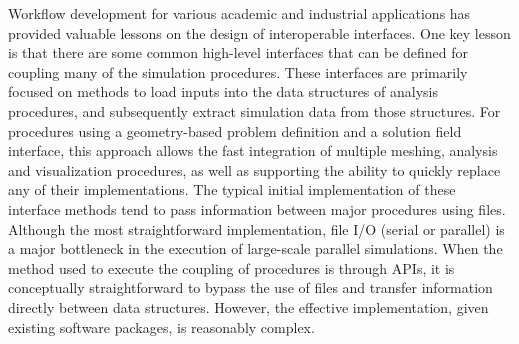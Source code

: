 Workflow development for various academic and industrial applications has
provided valuable lessons on the design of interoperable interfaces.
One key lesson is that there are some common high-level interfaces that can be
defined for coupling many of the simulation procedures.
These interfaces are primarily focused on methods to load inputs into the
data structures of analysis procedures, and subsequently extract
simulation data from those structures.
For procedures using a geometry-based problem definition and a solution field
interface, this approach allows the fast integration of multiple
meshing, analysis and visualization procedures, as well as supporting the
ability to quickly replace any of their implementations.
The typical initial implementation of these interface methods tend to pass
information between major procedures using files.
Although the most straightforward implementation, file I/O (serial or parallel)
is a major bottleneck in the execution of large-scale parallel simulations.
When the method used to execute the coupling of procedures is through APIs, it
is conceptually straightforward to bypass the use of files and transfer
information directly between data structures.
However, the effective implementation, given existing software packages,
is reasonably complex.

